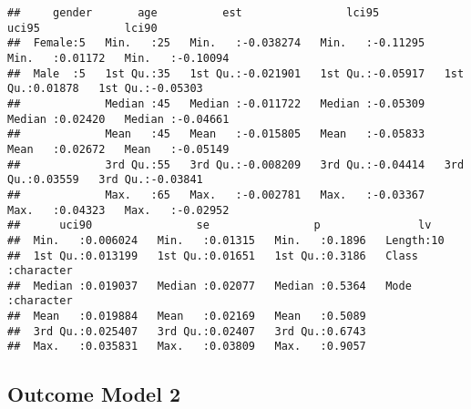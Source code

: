 \documentclass[
]{article}
\begin{document}
\begin{verbatim}
##     gender       age          est                lci95              uci95             lci90         
##  Female:5   Min.   :25   Min.   :-0.038274   Min.   :-0.11295   Min.   :0.01172   Min.   :-0.10094  
##  Male  :5   1st Qu.:35   1st Qu.:-0.021901   1st Qu.:-0.05917   1st Qu.:0.01878   1st Qu.:-0.05303  
##             Median :45   Median :-0.011722   Median :-0.05309   Median :0.02420   Median :-0.04661  
##             Mean   :45   Mean   :-0.015805   Mean   :-0.05833   Mean   :0.02672   Mean   :-0.05149  
##             3rd Qu.:55   3rd Qu.:-0.008209   3rd Qu.:-0.04414   3rd Qu.:0.03559   3rd Qu.:-0.03841  
##             Max.   :65   Max.   :-0.002781   Max.   :-0.03367   Max.   :0.04323   Max.   :-0.02952  
##      uci90                se                p               lv           
##  Min.   :0.006024   Min.   :0.01315   Min.   :0.1896   Length:10         
##  1st Qu.:0.013199   1st Qu.:0.01651   1st Qu.:0.3186   Class :character  
##  Median :0.019037   Median :0.02077   Median :0.5364   Mode  :character  
##  Mean   :0.019884   Mean   :0.02169   Mean   :0.5089                     
##  3rd Qu.:0.025407   3rd Qu.:0.02407   3rd Qu.:0.6743                     
##  Max.   :0.035831   Max.   :0.03809   Max.   :0.9057
\end{verbatim}

\hypertarget{outcome-model-2-5}{%
\subsection{Outcome Model 2}\label{outcome-model-2-5}}
\end{document}
